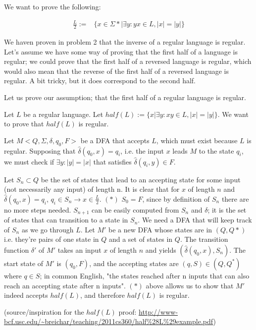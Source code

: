 
We want to prove the following:

\begin{align*}
\frac {L}{2} :=& \{x \in \Sigma * | \exists y : yx \in L, |x| = |y| \}
\end{align*}

We haven proven in problem 2 that the inverse of a regular language is regular. Let's assume we have some way of proving that the first half of a language is regular; we could prove that the first half of a reversed language is regular, which would also mean that the reverse of the first half of a reversed language is regular. A bit tricky, but it does correspond to the second half.

Let us prove our assumption; that the first half of a regular language is regular.


Let $L$ be a regular language. Let $half(L) := \{ x | \exists y : xy \in L, |x| = |y| \}$. We want to prove that $half(L)$ is regular.

Let $M < Q, \Sigma, \delta, q_0, F>$ be a DFA that accepts $L$, which must exist because $L$ is regular. Supposing that $\hat \delta (q_0, x) = q_i$, i.e. the input $x$ leads $M$ to the state $q_i$, we must check if $\exists y : |y| = |x|$ that satisfies $\hat \delta (q_i, y) \in F$. 

Let $S_n \subset Q$ be the set of states that lead to an accepting state for some input (not necessarily any input) of length n. 
It is clear that for $x$ of length $n$ and $\hat \delta(q_0, x) = q_i$, $q_i \in S_n \rightarrow x \in \frac L 2$.  $(*)$
$S_0 = F$, since by definition of $S_n$ there are no more steps needed. $S_{n+1}$ can be easily computed from $S_n$ and $\delta$; it is the set of states that can transition to a state in $S_n$.
We need a DFA that will keep track of $S_n$ as we go through $L$. Let $M'$ be a new DFA whose states are in $(Q, Q*)$ i.e. they're pairs of one state in $Q$ and a set of states in $Q$. The transition function $\delta'$ of $M'$ takes an input $x$ of length $n$ and yields $(\hat \delta(q_0, x), S_n)$.
The start state of $M'$ is $(q_0, F)$, and the accepting states are $(q, S) \in (Q, Q^*)$ where $q \in S$; in common English, "the states reached after n inputs that can also reach an accepting state after n inputs". 
$(*)$ above allows us to show that $M'$ indeed accepts $half(L)$, and therefore $half(L)$ is regular.

(source/inspiration for the $half(L)$ proof: \url{http://www-bcf.usc.edu/~breichar/teaching/2011cs360/half\%28L\%29example.pdf})

